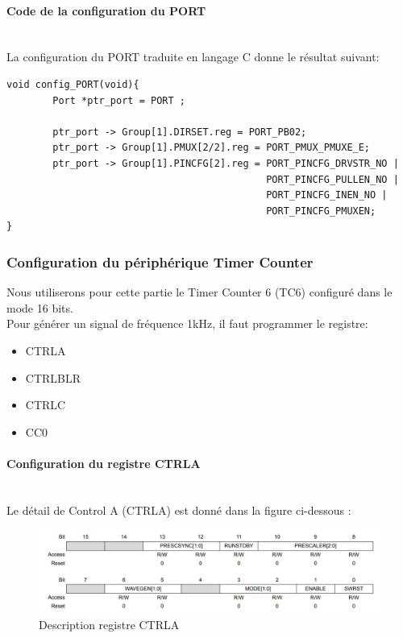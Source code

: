 \documentclass[a4paper]{article}
\begin{document}
	\paragraph{Code de la configuration du PORT} ~~\\
	La configuration du PORT traduite en langage C donne le résultat suivant:
	\begin{lstlisting}[style=CStyle]
void config_PORT(void){
	    Port *ptr_port = PORT ;
	
	    ptr_port -> Group[1].DIRSET.reg = PORT_PB02; 
	    ptr_port -> Group[1].PMUX[2/2].reg = PORT_PMUX_PMUXE_E;
	    ptr_port -> Group[1].PINCFG[2].reg = PORT_PINCFG_DRVSTR_NO |
	                                         PORT_PINCFG_PULLEN_NO |
	                                         PORT_PINCFG_INEN_NO |
	                                         PORT_PINCFG_PMUXEN;
}
	\end{lstlisting}
	
	\subsubsection{Configuration du périphérique Timer Counter} 
	Nous utiliserons pour cette partie le Timer Counter 6 (TC6) configuré dans le mode 16 bits.\\
	Pour générer un signal de fréquence 1kHz, il faut programmer le registre:
	\begin{itemize}
		\item {CTRLA}
		\item {CTRLBLR}
		\item {CTRLC}
		\item {CC0}
	\end{itemize}
	\paragraph{Configuration du registre CTRLA} 
	~~\\
	Le détail de Control A (CTRLA) est donné dans la figure ci-dessous :
	\begin{figure}[H]
		\centering
		\includegraphics[width=0.9\linewidth]{ControlA.jpg}
		\caption{Description registre CTRLA}
	\end{figure}
	
\end{document}
